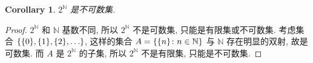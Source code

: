 \documentclass[UTF8]{ctexart}
\theoremstyle{mystyle}
\theoremstyle{myremark}
\theoremstyle{plain}
\newtheorem{corollary}{Corollary}[section]
\newcommand{\N}{\mathbb N}
\DeclarePairedDelimiter\set{\{}{\}}
\begin{document}
\begin{corollary}
    $ 2^\N $ 是不可数集.
\end{corollary}

\begin{proof}
    $ 2^\N $ 和 $ \N $ 基数不同, 所以 $ 2^\N $ 不是可数集, 只能是有限集或不可数集. 考虑集合 $ \set{\set{0}, \set{1}, \set{2}, \dots} $, 这样的集合 $ A = \set{\set{n} \colon n \in \N} $ 与 $ \N $ 存在明显的双射, 故是可数集. 而 $ A $ 是 $ 2^\N $ 的子集, 所以 $ 2^\N $ 不是有限集, 只能是不可数集.
\end{proof}
\end{document}
